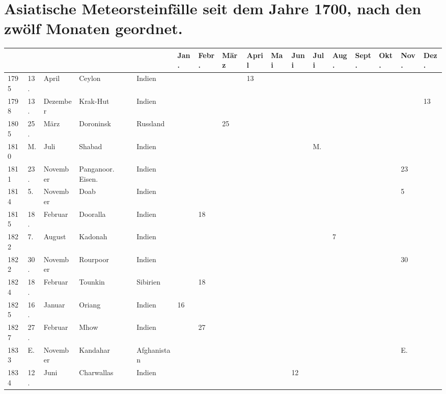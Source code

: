 \documentclass[a4paper, 11pt, oneside, polutonikogreek, german]{article}
\begin{document}
\section{Asiatische Meteorsteinfälle seit dem Jahre 1700, nach den zwölf Monaten geordnet.}
\begin{table}[!ht]
    \centering
    \begin{tabular}{|l|l|l|l|l|l|l|l|l|l|l|l|l|l|l|l|l|}
    \hline
         & & & & & Jan. & Febr. & März & April & Mai & Juni & Juli & Aug. & Sept. & Okt. & Nov. & Dez. \\ \hline
        1795 & 13. & April & Ceylon & Indien & ~ & ~ & ~ & 13 & ~ & ~ & ~ & ~ & ~ & ~ & ~ & ~ \\ \hline
        1798 & 13. & Dezember & Krak-Hut & Indien & ~ & ~ & ~ & ~ & ~ & ~ & ~ & ~ & ~ & ~ & ~ & 13 \\ \hline
        1805 & 25. & März & Doroninsk & Russland & ~ & ~ & 25 & ~ & ~ & ~ & ~ & ~ & ~ & ~ & ~ & ~ \\ \hline
        1810 & M. & Juli & Shabad & Indien & ~ & ~ & ~ & ~ & ~ & ~ & M. & ~ & ~ & ~ & ~ & ~ \\ \hline
        1811 & 23. & November & Panganoor. Eisen. & Indien & ~ & ~ & ~ & ~ & ~ & ~ & ~ & ~ & ~ & ~ & 23 & ~ \\ \hline
        1814 & 5. & November & Doab & Indien & ~ & ~ & ~ & ~ & ~ & ~ & ~ & ~ & ~ & ~ & 5 & ~ \\ \hline
        1815 & 18. & Februar & Dooralla & Indien & ~ & 18 & ~ & ~ & ~ & ~ & ~ & ~ & ~ & ~ & ~ & ~ \\ \hline
        1822 & 7. & August & Kadonah & Indien & ~ & ~ & ~ & ~ & ~ & ~ & ~ & 7 & ~ & ~ & ~ & ~ \\ \hline
        1822 & 30. & November & Rourpoor & Indien & ~ & ~ & ~ & ~ & ~ & ~ & ~ & ~ & ~ & ~ & 30 & ~ \\ \hline
        1824 & 18. & Februar & Tounkin & Sibirien & ~ & 18 & ~ & ~ & ~ & ~ & ~ & ~ & ~ & ~ & ~ & ~ \\ \hline
        1825 & 16. & Januar & Oriang & Indien & 16 & ~ & ~ & ~ & ~ & ~ & ~ & ~ & ~ & ~ & ~ & ~ \\ \hline
        1827 & 27. & Februar & Mhow & Indien & ~ & 27 & ~ & ~ & ~ & ~ & ~ & ~ & ~ & ~ & ~ & ~ \\ \hline
        1833 & E. & November & Kandahar & Afghanistan & ~ & ~ & ~ & ~ & ~ & ~ & ~ & ~ & ~ & ~ & E. & ~ \\ \hline
        1834 & 12. & Juni & Charwallas & Indien & ~ & ~ & ~ & ~ & ~ & 12 & ~ & ~ & ~ & ~ & ~ & ~ \\ \hline

\end{tabular}
\end{table}
\end{document}
